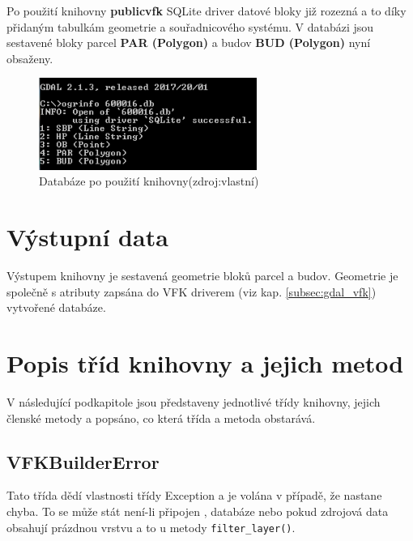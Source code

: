 Po použití knihovny \textbf{publicvfk} SQLite driver datové bloky již
rozezná a to díky přidaným tabulkám geometrie a souřadnicového systému. V
databázi jsou sestavené bloky parcel
\textbf{PAR (Polygon)} a budov \textbf{BUD (Polygon)} nyní obsaženy.
\begin{figure}[H]
	 \centering
     \includegraphics[height=3cm]{./pictures/funkcnost_knihovny_po.png}
     \caption{Databáze po použití knihovny(zdroj:vlastní)}
     \label{fig:funkcnost_po}
\end{figure}  
  
\section{Výstupní data}
Výstupem knihovny je sestavená geometrie bloků parcel a
budov. Geometrie je společně s atributy zapsána do VFK
driverem (viz kap. \ref{subsec:gdal_vfk}) vytvořené databáze.

\section{Popis tříd knihovny a jejich metod}
\label{sec:popis_trid}
V následující podkapitole jsou představeny jednotlivé třídy knihovny,
jejich členské metody a popsáno, co která třída a metoda obstarává.

\subsection{VFKBuilderError}
Tato třída dědí vlastnosti třídy Exception a je volána v případě, že
nastane chyba. To se může stát není-li připojen ,
databáze nebo pokud zdrojová data obsahují prázdnou vrstvu a to u metody \verb|filter_layer()|.

